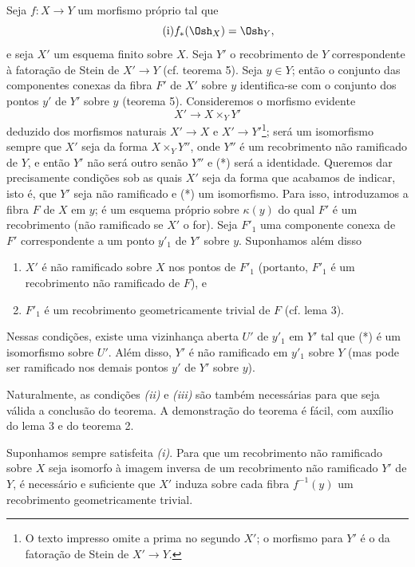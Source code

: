 Seja $f:X\longrightarrow Y$ um morfismo próprio tal que
\begin{equation}
  \tag{i}
  f_*(\Osh_X)=\Osh_Y,
\end{equation}
e seja $X'$ um esquema finito sobre $X$. Seja $Y'$ o recobrimento de $Y$
correspondente à fatoração de Stein de $X'\longrightarrow Y$
(cf. teorema 5). Seja $y\in Y$; então o conjunto das componentes conexas
da fibra $F'$ de $X'$ sobre $y$ identifica-se com o conjunto dos pontos
$y'$ de $Y'$ sobre $y$ (teorema 5). Consideremos o morfismo evidente
\begin{equation}
  \tag{*}
  X'\longrightarrow X\times_Y Y'
\end{equation}
deduzido dos morfismos naturais $X'\longrightarrow X$ e
$X'\longrightarrow Y'$\footnote{O texto impresso omite a prima no segundo
$X'$; o morfismo para $Y'$ é o da fatoração de Stein de
$X'\to Y$.}; será um isomorfismo sempre que $X'$ seja da forma
$X\times_Y Y''$, onde $Y''$ é um recobrimento não ramificado de $Y$, e
então $Y'$ não será outro senão $Y''$ e (*) será a identidade. Queremos dar
precisamente condições sob as quais $X'$ seja da forma que acabamos de
indicar, isto é, que $Y'$ seja não ramificado e (*) um isomorfismo. Para isso,
introduzamos a fibra $F$ de $X$ em $y$; é um esquema próprio sobre
$\kappa(y)$ do qual $F'$ é um recobrimento (não ramificado se $X'$ o for).
Seja $F'_1$ uma componente conexa de $F'$ correspondente a um ponto $y'_1$ de
$Y'$ sobre $y$. Suponhamos além disso
\begin{enumerate}
  \item[\textit{(ii)}] $X'$ é não ramificado sobre $X$ nos pontos de $F'_1$
    (portanto, $F'_1$ é um recobrimento não ramificado de $F$), e
  \item[\textit{(iii)}] $F'_1$ é um recobrimento geometricamente trivial de
    $F$ (cf. lema 3).
\end{enumerate}

 Nessas condições, existe uma vizinhança aberta $U'$ de
$y'_1$ em $Y'$ tal que (*) é um isomorfismo sobre $U'$. Além disso, $Y'$ é não
ramificado em $y'_1$ sobre $Y$ (mas pode ser ramificado nos demais pontos
$y'$ de $Y'$ sobre $y$).

Naturalmente, as condições \textit{(ii)} e \textit{(iii)} são também
necessárias para que seja válida a conclusão do teorema. A demonstração do
teorema é fácil, com auxílio do lema 3 e do teorema 2.

 Suponhamos sempre satisfeita \textit{(i)}. Para que um
recobrimento não ramificado sobre $X$ seja isomorfo à imagem inversa de um
recobrimento não ramificado $Y'$ de $Y$, é necessário e suficiente que $X'$
induza sobre cada fibra $f^{-1}(y)$ um recobrimento geometricamente trivial.

